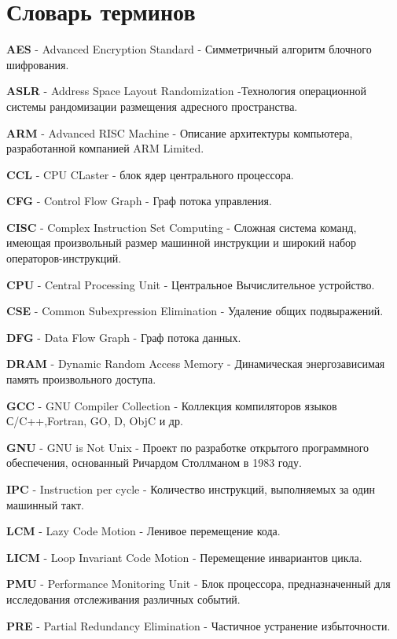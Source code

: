 \chapter*{Словарь терминов}             %

\textbf{AES} - Advanced Encryption Standard  - Симметричный алгоритм блочного шифрования.

\textbf{ASLR} - Address Space Layout Randomization -Технология операционной системы рандомизации размещения адресного пространства.

\textbf{ARM} - Advanced RISC Machine - Описание архитектуры компьютера, разработанной компанией  ARM Limited.

\textbf{CCL} - CPU CLaster - блок ядер центрального процессора.

\textbf{CFG} - Control Flow Graph - Граф потока управления.

\textbf{CISC} - Complex Instruction Set Computing  - Сложная система команд, имеющая произвольный размер машинной инструкции и широкий набор операторов-инструкций.

\textbf{CPU} - Central Processing Unit - Центральное Вычислительное устройство.

\textbf{CSE} - Common Subexpression Elimination - Удаление общих подвыражений.

\textbf{DFG} - Data Flow Graph  - Граф потока данных.

\textbf{DRAM} - Dynamic Random Access Memory - Динамическая энергозависимая память произвольного доступа.

\textbf{GCC} - GNU Compiler Collection - Коллекция компиляторов языков С/C++,Fortran, GO, D, ObjC и др.

\textbf{GNU} - GNU is Not Unix - Проект по разработке открытого программного обеспечения, основанный Ричардом Столлманом в 1983 году.

\textbf{IPC} - Instruction per cycle - Количество инструкций, выполняемых за один машинный такт. 

\textbf{LCM} - Lazy Code Motion - Ленивое перемещение кода.

\textbf{LICM} - Loop Invariant Code Motion - Перемещение инвариантов цикла.

\textbf{PMU} - Performance Monitoring Unit - Блок процессора, предназначенный для исследования отслеживания различных событий.

\textbf{PRE} - Partial Redundancy Elimination - Частичное устранение избыточности.

